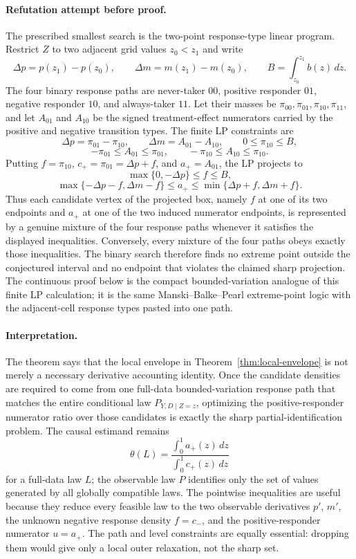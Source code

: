 \paragraph{Refutation attempt before proof.}
The prescribed smallest search is the two-point response-type linear program.
Restrict \(Z\) to two adjacent grid values \(z_0<z_1\) and write
\[
\Delta p=p(z_1)-p(z_0),\qquad
\Delta m=m(z_1)-m(z_0),\qquad
B=\int_{z_0}^{z_1}b(z)\,dz .
\]
The four binary response paths are never-taker \(00\), positive responder
\(01\), negative responder \(10\), and always-taker \(11\).  Let their masses
be \(\pi_{00},\pi_{01},\pi_{10},\pi_{11}\), and let \(A_{01}\) and \(A_{10}\)
be the signed treatment-effect numerators carried by the positive and
negative transition types.  The finite LP constraints are
\[
\Delta p=\pi_{01}-\pi_{10},\qquad
\Delta m=A_{01}-A_{10},\qquad
0\le\pi_{10}\le B,
\]
\[
-\pi_{01}\le A_{01}\le\pi_{01},
\qquad
-\pi_{10}\le A_{10}\le\pi_{10}.
\]
Putting \(f=\pi_{10}\), \(c_+=\pi_{01}=\Delta p+f\), and
\(a_+=A_{01}\), the LP projects to
\[
\max\{0,-\Delta p\}\le f\le B,
\]
\[
\max\{-\Delta p-f,\Delta m-f\}\le a_+\le
\min\{\Delta p+f,\Delta m+f\}.
\]
Thus each candidate vertex of the projected box, namely \(f\) at one of its
two endpoints and \(a_+\) at one of the two induced numerator endpoints,
is represented by a genuine mixture of the four response paths whenever it
satisfies the displayed inequalities.  Conversely, every mixture of the four
paths obeys exactly those inequalities.  The binary search therefore finds no
extreme point outside the conjectured interval and no endpoint that violates
the claimed sharp projection.  The continuous proof below is the compact
bounded-variation analogue of this finite LP calculation; it is the same
Manski--Balke--Pearl extreme-point logic with the adjacent-cell response
types pasted into one path.

\paragraph{Interpretation.}
The theorem says that the local envelope in Theorem~\ref{thm:local-envelope}
is not merely a necessary derivative accounting identity.  Once the candidate
densities are required to come from one full-data bounded-variation response
path that matches the entire conditional law \(P_{Y,D\mid Z=z}\), optimizing
the positive-responder numerator ratio over those candidates is exactly the
sharp partial-identification problem.  The causal estimand remains
\[
\theta(L)=
\frac{\int_0^1 a_+(z)\,dz}{\int_0^1 c_+(z)\,dz}
\]
for a full-data law \(L\); the observable law \(P\) identifies only the set of
values generated by all globally compatible laws.  The pointwise inequalities
are useful because they reduce every feasible law to the two observable
derivatives \(p'\), \(m'\), the unknown negative response density \(f=c_-\),
and the positive-responder numerator \(u=a_+\).  The path and level
constraints are equally essential: dropping them would give only a local outer
relaxation, not the sharp set.


